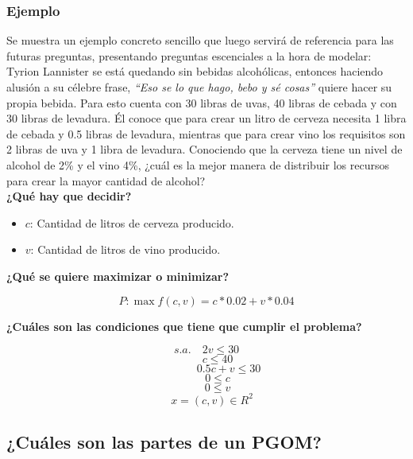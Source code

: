\documentclass[a4paper,10pt,twocolumn]{article}
\theoremstyle{theorem}
\theoremstyle{definition}
\theoremstyle{remark}
\begin{document}
		\subsubsection{Ejemplo}\label{subsub:ejemplo}

Se muestra un ejemplo concreto sencillo que luego servirá de referencia para las futuras preguntas, presentando preguntas escenciales a la hora de modelar:\\

Tyrion Lannister se está quedando sin bebidas alcohólicas, entonces haciendo alusión a su célebre frase, \textit{“Eso se lo que hago, bebo y sé cosas”} quiere hacer su propia bebida. Para esto cuenta con 30 libras de uvas, 40 libras de cebada y con 30 libras de levadura. Él conoce que para crear un litro de cerveza necesita 1 libra de cebada y 0.5 libras de levadura, mientras que para crear vino los requisitos son 2 libras de uva y 1 libra de levadura. Conociendo que la cerveza tiene un nivel de alcohol de 2\% y el vino 4\%, ¿cuál es la mejor manera de distribuir los recursos para crear la mayor cantidad de alcohol?\\

\textbf{¿Qué hay que decidir?}

\begin{itemize}
	\item $c$: Cantidad de litros de cerveza producido.
	\item $v$: Cantidad de litros de vino producido.
\end{itemize}

\textbf{¿Qué se quiere maximizar o minimizar?}

$$
P: \max f(c, v) = c * 0.02 + v * 0.04
$$

\textbf{¿Cuáles son las condiciones que tiene que cumplir el problema?}

$$
s.a. \quad 2 v \le 30
$$
$$
\qquad c \le 40
$$
$$
\qquad \qquad 0.5 c + v \le 30 
$$
$$
\qquad 0 \le c 
$$
$$
\qquad 0 \le v 
$$
$$
\quad x = (c, v) \in R^2
$$

	\subsection{¿Cuáles son las partes de un PGOM?}\label{sub:results}
\end{document}
